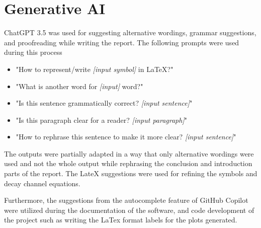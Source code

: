 \documentclass{article}
\begin{document}



\appendix
\section{Generative AI}

ChatGPT 3.5 was used for suggesting alternative wordings, grammar suggestions, and proofreading while writing the report. The following prompts were used during this process

\begin{itemize}

  \item "How to represent/write \textit{[input symbol]} in LaTeX?"
  \item "What is another word for \textit{[input]} word?"
  \item "Is this sentence grammatically correct? \textit{[input sentence]}"
  \item "Is this paragraph clear for a reader? \textit{[input paragraph]}"
  \item "How to rephrase this sentence to make it more clear? \textit{[input sentence]}"
\end{itemize}


The outputs were partially adapted in a way that only alternative wordings were used and not the whole output while rephrasing the conclusion and introduction parts of the report. The LateX suggestions were used for refining the symbols and decay channel equations.

Furthermore, the suggestions from the autocomplete feature of GitHub Copilot were utilized during the documentation of the software, and code development of the project such as writing the LaTex format labels for the plots generated.
\end{document}
